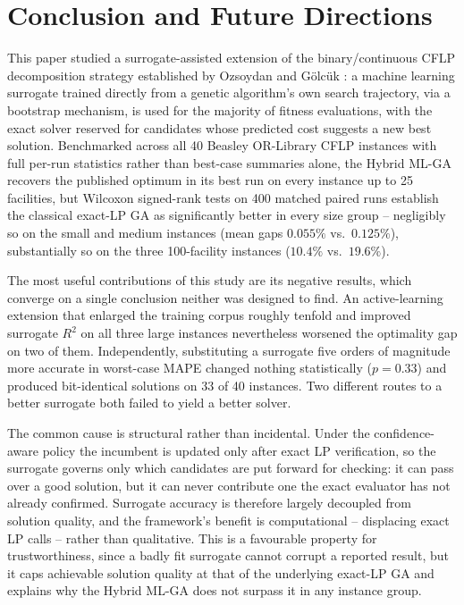 \documentclass[conference]{IEEEtran}
\begin{document}
\section{Conclusion and Future Directions}

This paper studied a surrogate-assisted extension of the binary/continuous
CFLP decomposition strategy established by Ozsoydan and G\"{o}lc\"{u}k
\citep{ozsoydan2023}: a machine learning surrogate trained directly from a
genetic algorithm's own search trajectory, via a bootstrap mechanism, is used
for the majority of fitness evaluations, with the exact solver reserved for
candidates whose predicted cost suggests a new best solution. Benchmarked
across all 40 Beasley OR-Library CFLP instances with full per-run statistics
rather than best-case summaries alone, the Hybrid ML-GA recovers the published
optimum in its best run on every instance up to 25 facilities, but Wilcoxon
signed-rank tests on 400 matched paired runs establish the classical exact-LP
GA as significantly better in every size group -- negligibly so on the small
and medium instances (mean gaps $0.055\%$ vs.\ $0.125\%$), substantially so on
the three 100-facility instances ($10.4\%$ vs.\ $19.6\%$).

The most useful contributions of this study are its negative results, which
converge on a single conclusion neither was designed to find. An
active-learning extension that enlarged the training corpus roughly tenfold and
improved surrogate $R^2$ on all three large instances nevertheless worsened the
optimality gap on two of them. Independently, substituting a surrogate five
orders of magnitude more accurate in worst-case MAPE changed nothing
statistically ($p = 0.33$) and produced bit-identical solutions on 33 of 40
instances. Two different routes to a better surrogate both failed to yield a
better solver.

The common cause is structural rather than incidental. Under the
confidence-aware policy the incumbent is updated only after exact LP
verification, so the surrogate governs only which candidates are put forward
for checking: it can pass over a good solution, but it can never contribute one
the exact evaluator has not already confirmed. Surrogate accuracy is therefore
largely decoupled from solution quality, and the framework's benefit is
computational -- displacing exact LP calls -- rather than qualitative. This is
a favourable property for trustworthiness, since a badly fit surrogate cannot
corrupt a reported result, but it caps achievable solution quality at that of
the underlying exact-LP GA and explains why the Hybrid ML-GA does not surpass
it in any instance group.
\end{document}
